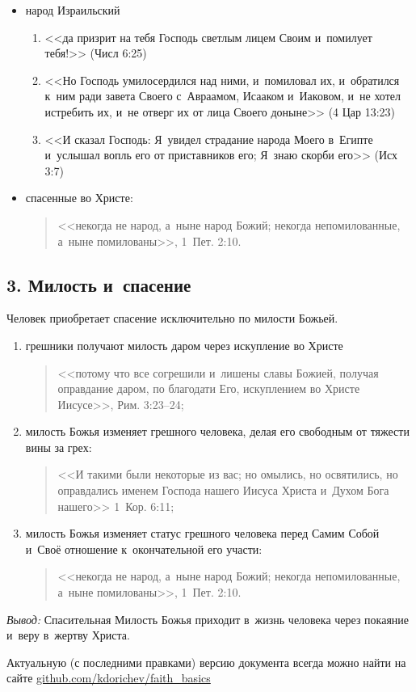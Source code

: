 \documentclass[a4paper,12pt]{article}
\begin{document}
\begin{enumerate}
\begin{itemize}
        \item народ Израильский
        \begin{enumerate}
            \item <<да призрит на тебя Господь светлым лицем Своим и~помилует тебя!>> (Числ 6:25) 
            \item <<Но Господь умилосердился над ними, и~помиловал их, и~обратился к~ним ради завета Своего с~Авраамом, Исааком и~Иаковом, и~не хотел истребить их, и~не отверг их от лица Своего доныне>> (4 Цар 13:23) 
            \item <<И сказал Господь: Я~увидел страдание народа Моего в~Египте и~услышал вопль его от приставников его; Я~знаю скорби его>> (Исх 3:7)
        \end{enumerate}

        \item спасенные во Христе:
        \begin{quote}
        <<некогда не народ, а~ныне народ Божий; некогда непомилованные, а~ныне помилованы>>, 1~Пет. 2:10.
        \end{quote}
    \end{itemize}
\end{enumerate}

\subsection{3. Милость и~спасение}
Человек приобретает спасение исключительно по милости Божьей.
\begin{enumerate}
    \item грешники получают милость даром через искупление во Христе
    \begin{quote}
    <<потому что все согрешили и~лишены славы Божией, получая оправдание даром, по благодати Его, искуплением во Христе Иисусе>>, Рим. 3:23--24;
    \end{quote}
    \item милость Божья изменяет грешного человека, делая его свободным от тяжести вины за грех:
    \begin{quote}
    <<И такими были некоторые из вас; но омылись, но освятились, но оправдались именем Господа нашего Иисуса Христа и~Духом Бога нашего>> 1~Кор. 6:11;
    \end{quote}

    \item милость Божья изменяет статус грешного человека перед Самим Собой и~Своё отношение к~окончательной его участи:
    \begin{quote}
    <<некогда не народ, а~ныне народ Божий; некогда непомилованные, а~ныне помилованы>>, 1~Пет. 2:10.
    \end{quote}
\end{enumerate}

\noindent \emph{Вывод:} Спасительная Милость Божья приходит в~жизнь человека через покаяние и~веру в~жертву Христа. 

\vfill
\tiny{Актуальную (с последними правками) версию документа всегда можно найти на сайте \href{https://github.com/kdorichev/faith_basics/blob/main/God/lesson_3.7.pdf}{github.com/kdorichev/faith\_basics}}
\end{document}
